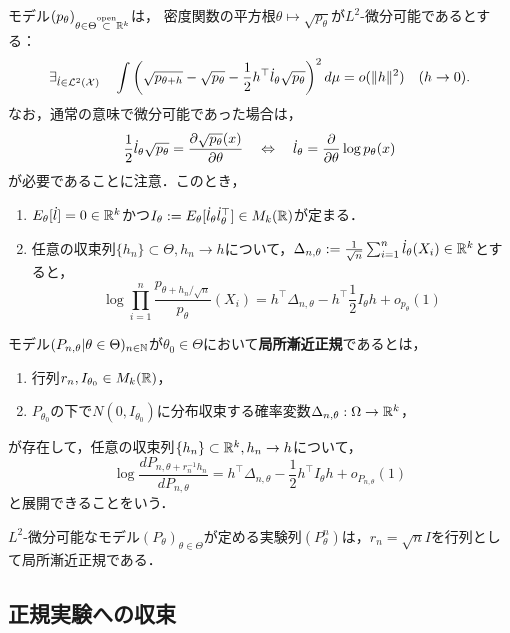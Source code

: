 \documentclass[uplatex,dvipdfmx]{jsreport}
\begin{document}
\begin{theorem}[局所漸近正規性の十分条件]\label{thm-sufficient-condition-for-parametric-LAN}
    モデル$(p_\theta)_{\theta\in\Theta\overset{\mathrm{open}}{\subset}\mathbb{R}^k}$は，
    密度関数の平方根$\theta\mapsto\sqrt{p_\theta}$が$L^2$-微分可能であるとする：
    \[\exists_{\dot{l}\in\mathcal{L}^2(\mathcal{X})}\quad\int\left(\sqrt{p_{\theta+h}}-\sqrt{p_\theta}-\frac{1}{2}h^\top \dot{l}_\theta\sqrt{p_\theta}\right)^2d\mu=o(\|h\|^2)\quad(h\to0).\]
    なお，通常の意味で微分可能であった場合は，
    \[\frac{1}{2}\dot{l}_\theta\sqrt{p_\theta}=\frac{\partial \sqrt{p_\theta}(x)}{\partial \theta}\quad\Leftrightarrow\quad \dot{l}_\theta=\frac{\partial }{\partial \theta}\log p_\theta(x)\]
    が必要であることに注意．このとき，
    \begin{enumerate}
        \item $E_\theta[\dot{l}]=0\in\mathbb{R}^k$かつ$I_\theta:=E_\theta[\dot{l}_\theta\dot{l}_\theta^\top]\in M_k(\mathbb{R})$が定まる．
        \item 任意の収束列$\{h_n\}\subset\Theta,h_n\to h$について，$\Delta_{n,\theta}:=\frac{1}{\sqrt{n}}\sum^n_{i=1}\dot{l}_\theta(X_i)\in\mathbb{R}^k$とすると，
        \[\log\prod_{i=1}^n\frac{p_{\theta+h_n/\sqrt{n}}}{p_\theta}(X_i)=h^\top\Delta_{n,\theta}-h^\top\frac{1}{2}I_\theta h+o_{p_\theta}(1)\]
    \end{enumerate}
\end{theorem}

\begin{definition}
    モデル$(P_{n,\theta}|\theta\in\Theta)_{n\in\mathbb{N}}$が$\theta_0\in\Theta$において\textbf{局所漸近正規}であるとは，
    \begin{enumerate}
        \item 行列$r_n,I_{\theta_0}\in M_k(\mathbb{R})$，
        \item $P_{\theta_0}$の下で$N(0,I_{\theta_0})$に分布収束する確率変数$\Delta_{n,\theta}:\Omega\to\mathbb{R}^k$，
    \end{enumerate}
    が存在して，任意の収束列$\{h_n\}\subset\mathbb{R}^k,h_n\to h$について，
    \[\log\frac{dP_{n,\theta+r_n^{-1}h_n}}{dP_{n,\theta}}=h^\top\Delta_{n,\theta}-\frac{1}{2}h^\top I_\theta h+o_{P_{n,\theta}}(1)\]
    と展開できることをいう．
\end{definition}
\begin{example}
    $L^2$-微分可能なモデル$(P_\theta)_{\theta\in\Theta}$が定める実験列$(P^n_\theta)$は，$r_n=\sqrt{n}I$を行列として局所漸近正規である．
\end{example}

\subsection{正規実験への収束}
\end{document}
